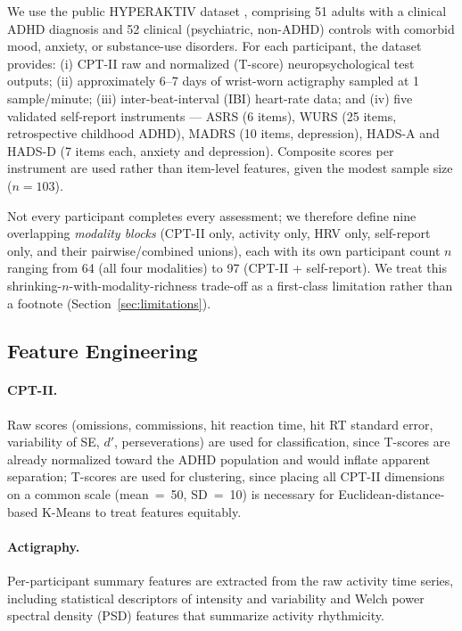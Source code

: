 \documentclass[11pt]{article}
\begin{document}
We use the public HYPERAKTIV dataset \citep{hicks2021hyperaktiv}, comprising 51 adults with a clinical ADHD diagnosis and 52 clinical (psychiatric, non-ADHD) controls with comorbid mood, anxiety, or substance-use disorders. For each participant, the dataset provides: (i) CPT-II raw and normalized (T-score) neuropsychological test outputs; (ii) approximately 6--7 days of wrist-worn actigraphy sampled at 1 sample/minute; (iii) inter-beat-interval (IBI) heart-rate data; and (iv) five validated self-report instruments --- ASRS (6 items), WURS (25 items, retrospective childhood ADHD), MADRS (10 items, depression), HADS-A and HADS-D (7 items each, anxiety and depression). Composite scores per instrument are used rather than item-level features, given the modest sample size ($n=103$).

Not every participant completes every assessment; we therefore define nine overlapping \emph{modality blocks} (CPT-II only, activity only, HRV only, self-report only, and their pairwise/combined unions), each with its own participant count $n$ ranging from 64 (all four modalities) to 97 (CPT-II + self-report). We treat this shrinking-$n$-with-modality-richness trade-off as a first-class limitation rather than a footnote (Section~\ref{sec:limitations}).

\subsection{Feature Engineering}

\paragraph{CPT-II.} Raw scores (omissions, commissions, hit reaction time, hit RT standard error, variability of SE, $d'$, perseverations) are used for classification, since T-scores are already normalized toward the ADHD population and would inflate apparent separation; T-scores are used for clustering, since placing all CPT-II dimensions on a common scale (mean~=~50, SD~=~10) is necessary for Euclidean-distance-based K-Means to treat features equitably.

\paragraph{Actigraphy.} Per-participant summary features are extracted from the raw activity time series, including statistical descriptors of intensity and variability and Welch power spectral density (PSD) features that summarize activity rhythmicity.
\end{document}
